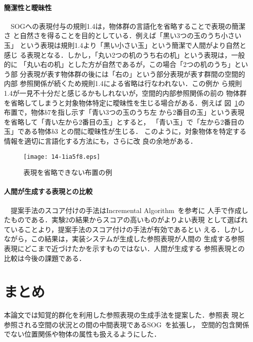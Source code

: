 \documentclass[japanese]{jnlp_1.2}
\def\rel#1{}
\begin{document}
\paragraph{簡潔性と曖昧性}
　SOGへの表現付与の規則1.4は，物体群の言語化を省略することで表現の簡潔さ
と自然さを得ることを目的としている．例えば「黒い3つの玉のうち小さい玉」
という表現は規則1.4より「黒い小さい玉」という簡潔で人間がより自然と感じ
る表現となる．しかし，「丸い2つの机のうち右の机」という表現は，一般的に
「丸い右の机」とした方が自然であるが，この場合「2つの机のうち」という部
分表現が表す物体群の後には「右の」という部分表現が表す群間の空間的内部
参照関係\rel{space}が続くため規則1.4による省略は行なわれない．この例か
ら規則1.4が一見不十分だと感じるかもしれないが，空間的内部参照関係の前の
物体群を省略してしまうと対象物体特定に曖昧性を生じる場合がある．例えば
図~\ref{fig:Problem2}の布置で，物体$b7$を指し示す「青い3つの玉のうち左
から2番目の玉」という表現を省略して「青い左から2番目の玉」とすると，
「青い玉」で「左から2番目の玉」である物体$b3$ との間に曖昧性が生じる．
このように，対象物体を特定する情報を適切に言語化する方法にも，さらに改
良の余地がある．

\begin{figure}[htbp]
  \begin{center}
    \texttt{[image: 14-1ia5f8.eps]}
    \caption{表現を省略できない布置の例}
    \label{fig:Problem2}
  \end{center}
\end{figure}

\paragraph{人間が生成する表現との比較}
　提案手法のスコア付けの手法はIncremental Algorithm~\cite{RD1995}を参考に
人手で作成したものである．実験2の結果からスコアの高いものがよりよい表現
として選ばれていることより，提案手法のスコア付けの手法が有効であるとい
える．しかしながら，この結果は，実装システムが生成した参照表現が人間の
生成する参照表現にどこまで近づけたかを示すものではない．人間が生成する
参照表現との比較は今後の課題である．


\section{まとめ}\label{sec:Conclusion}

本論文では知覚的群化を利用した参照表現の生成手法を提案した．参照表
現と参照される空間の状況との間の中間表現であるSOG~\cite{KF2006}を拡張し，
空間的包含関係でない位置関係や物体の属性も扱えるようにした．
\end{document}

